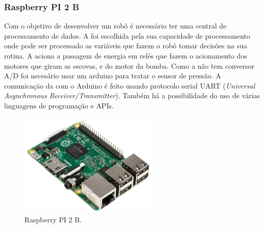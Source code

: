 \subsubsection{Raspberry PI 2 B}
Com o objetivo de desenvolver um robô é necessário ter uma central de processamento de dados. A \rasp  foi escolhida pela sua capacidade de processamento onde pode ser processado as variáveis que fazem o robô tomar decisões na sua rotina. A \rasp aciona a passagem de energia em  relés que fazem o acionamento dos motores que giram as escovas, e do motor da bomba. Como a \rasp não tem conversor A/D foi necesário usar um arduino para tratar o sensor de pressão. A comunicação da \rasp com o Arduino é feito usando protocolo serial  \textsf{UART} (\textit{Universal Asynchronous Receiver/Transmitter}). Também há a possibilidade do uso de várias linguagens de programação e \textsf{APIs}.
\par
\begin{figure}[h]
  \centering
  \includegraphics[width=0.6\textwidth]{figures/rpi2b.jpg}
  \caption{Raspberry PI 2 B. \cite{raspfoundationgpio2016}}
  \label{fig:schema-eletro-soft}
\end{figure}
\FloatBarrier
\par

